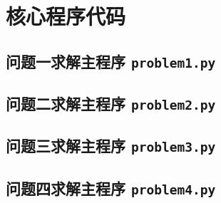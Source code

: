 \documentclass{cumcm2026}
\begin{document}
\section{核心程序代码}

\subsection{问题一求解主程序 \texttt{problem1.py}}


\subsection{问题二求解主程序 \texttt{problem2.py}}


\subsection{问题三求解主程序 \texttt{problem3.py}}


\subsection{问题四求解主程序 \texttt{problem4.py}}


% 
% 
\end{document}
